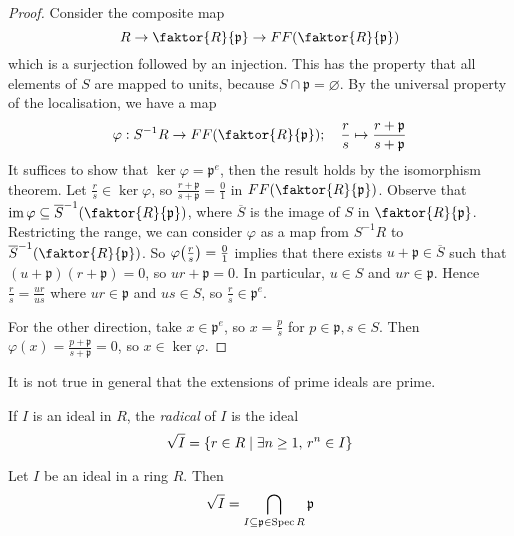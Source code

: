 \begin{proof}
    Consider the composite map
    \[ R \to \faktor{R}{\mathfrak p} \to FF\qty(\faktor{R}{\mathfrak p}) \]
    which is a surjection followed by an injection.
    This has the property that all elements of \( S \) are mapped to units, because \( S \cap \mathfrak p = \varnothing \).
    By the universal property of the localisation, we have a map
    \[ \varphi : S^{-1}R \to FF\qty(\faktor{R}{\mathfrak p});\quad \frac{r}{s} \mapsto \frac{r + \mathfrak p}{s + \mathfrak p} \]
    It suffices to show that \( \ker \varphi = \mathfrak p^e \), then the result holds by the isomorphism theorem.
    Let \( \frac{r}{s} \in \ker \varphi \), so \( \frac{r + \mathfrak p}{s + \mathfrak p} = \frac{0}{1} \) in \( FF\qty(\faktor{R}{\mathfrak p}) \).
    Observe that \( \im \varphi \subseteq \overline S^{-1} \qty(\faktor{R}{\mathfrak p}) \), where \( \overline S \) is the image of \( S \) in \( \faktor{R}{\mathfrak p} \).
    Restricting the range, we can consider \( \varphi \) as a map from \( S^{-1}R \) to \( \overline S^{-1}\qty(\faktor{R}{\mathfrak p}) \).
    So \( \varphi\qty(\frac{r}{s}) = \frac{0}{1} \) implies that there exists \( u + \mathfrak p \in \overline S \) such that \( (u + \mathfrak p)(r + \mathfrak p) = 0 \), so \( ur + \mathfrak p = 0 \).
    In particular, \( u \in S \) and \( ur \in \mathfrak p \).
    Hence \( \frac{r}{s} = \frac{ur}{us} \) where \( ur \in \mathfrak p \) and \( us \in S \), so \( \frac{r}{s} \in \mathfrak p^e \).

    For the other direction, take \( x \in \mathfrak p^e \), so \( x = \frac{p}{s} \) for \( p \in \mathfrak p, s \in S \).
    Then \( \varphi(x) = \frac{p + \mathfrak p}{s + \mathfrak p} = 0 \), so \( x \in \ker \varphi \).
\end{proof}
It is not true in general that the extensions of prime ideals are prime.
\begin{definition}
    If \( I \) is an ideal in \( R \), the \emph{radical} of \( I \) is the ideal
    \[ \sqrt{I} = \qty{r \in R \mid \exists n \geq 1,\, r^n \in I} \]
\end{definition}
\begin{proposition}
    Let \( I \) be an ideal in a ring \( R \).
    Then
    \[ \sqrt{I} = \bigcap_{I \subseteq \mathfrak p \in \operatorname{Spec} R} \mathfrak p \]
\end{proposition}
